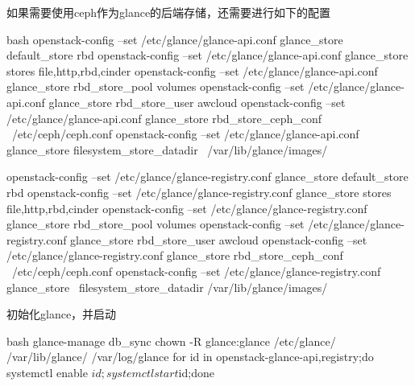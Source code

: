 如果需要使用ceph作为glance的后端存储，还需要进行如下的配置
\begin{code-block}{bash}
openstack-config --set /etc/glance/glance-api.conf glance_store default_store rbd
openstack-config --set /etc/glance/glance-api.conf glance_store stores file,http,rbd,cinder
openstack-config --set /etc/glance/glance-api.conf glance_store rbd_store_pool volumes
openstack-config --set /etc/glance/glance-api.conf glance_store rbd_store_user awcloud
openstack-config --set /etc/glance/glance-api.conf glance_store rbd_store_ceph_conf \
    /etc/ceph/ceph.conf
openstack-config --set /etc/glance/glance-api.conf glance_store filesystem_store_datadir \
    /var/lib/glance/images/

openstack-config --set /etc/glance/glance-registry.conf glance_store default_store rbd
openstack-config --set /etc/glance/glance-registry.conf glance_store stores file,http,rbd,cinder
openstack-config --set /etc/glance/glance-registry.conf glance_store rbd_store_pool volumes
openstack-config --set /etc/glance/glance-registry.conf glance_store rbd_store_user awcloud
openstack-config --set /etc/glance/glance-registry.conf glance_store rbd_store_ceph_conf \
    /etc/ceph/ceph.conf
openstack-config --set /etc/glance/glance-registry.conf glance_store \
    filesystem_store_datadir /var/lib/glance/images/
\end{code-block}

初始化glance，并启动
\begin{code-block}{bash}
glance-manage db_sync
chown -R glance:glance /etc/glance/ /var/lib/glance/ /var/log/glance
for id in openstack-glance-{api,registry};do systemctl enable $id;systemctl start $id;done
\end{code-block}
